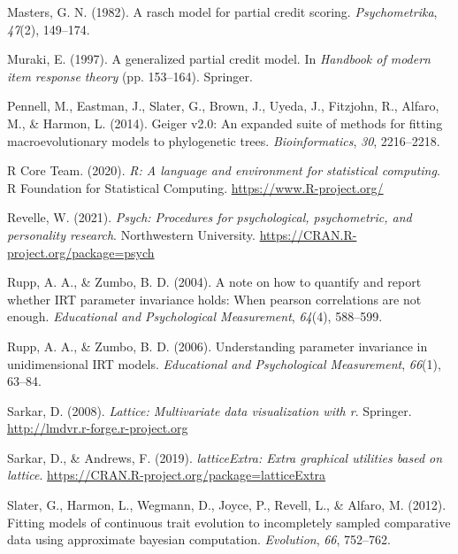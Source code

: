 \documentclass[
  man]{apa6}
\newlength{\cslhangindent}
\newlength{\cslentryspacingunit} %
\newenvironment{CSLReferences}[2] %
 {%
  \setlength{\parindent}{0pt}
  \ifodd #1
  \let\oldpar\par
  \def\par{\hangindent=\cslhangindent\oldpar}
  \fi
  \setlength{\parskip}{#2\cslentryspacingunit}
 }%
 {}
\begin{document}
\begin{CSLReferences}{1}{0}
\leavevmode{}%
Masters, G. N. (1982). A rasch model for partial credit scoring. \emph{Psychometrika}, \emph{47}(2), 149--174.

\leavevmode{}%
Muraki, E. (1997). A generalized partial credit model. In \emph{Handbook of modern item response theory} (pp. 153--164). Springer.

\leavevmode{}%
Pennell, M., Eastman, J., Slater, G., Brown, J., Uyeda, J., Fitzjohn, R., Alfaro, M., \& Harmon, L. (2014). Geiger v2.0: An expanded suite of methods for fitting macroevolutionary models to phylogenetic trees. \emph{Bioinformatics}, \emph{30}, 2216--2218.

\leavevmode{}%
R Core Team. (2020). \emph{R: A language and environment for statistical computing}. R Foundation for Statistical Computing. \url{https://www.R-project.org/}

\leavevmode{}%
Revelle, W. (2021). \emph{Psych: Procedures for psychological, psychometric, and personality research}. Northwestern University. \url{https://CRAN.R-project.org/package=psych}

\leavevmode{}%
Rupp, A. A., \& Zumbo, B. D. (2004). A note on how to quantify and report whether IRT parameter invariance holds: When pearson correlations are not enough. \emph{Educational and Psychological Measurement}, \emph{64}(4), 588--599.

\leavevmode{}%
Rupp, A. A., \& Zumbo, B. D. (2006). Understanding parameter invariance in unidimensional IRT models. \emph{Educational and Psychological Measurement}, \emph{66}(1), 63--84.

\leavevmode{}%
Sarkar, D. (2008). \emph{Lattice: Multivariate data visualization with r}. Springer. \url{http://lmdvr.r-forge.r-project.org}

\leavevmode{}%
Sarkar, D., \& Andrews, F. (2019). \emph{latticeExtra: Extra graphical utilities based on lattice}. \url{https://CRAN.R-project.org/package=latticeExtra}

\leavevmode{}%
Slater, G., Harmon, L., Wegmann, D., Joyce, P., Revell, L., \& Alfaro, M. (2012). Fitting models of continuous trait evolution to incompletely sampled comparative data using approximate bayesian computation. \emph{Evolution}, \emph{66}, 752--762.


\end{CSLReferences}
\end{document}
